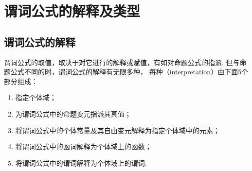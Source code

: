 
\section{谓词公式的解释及类型}
\subsection{谓词公式的解释}
谓词公式的取值，取决于对它进行的解释或赋值，有如对命题公式的指派.
但与命题公式不同的时，谓词公式的解释有无限多种，
每种（interpretation）由下面5个部分组成：\begin{enumerate}
	\item 指定个体域；
	\item 为谓词公式中的命题变元指派其真值；
	\item 将谓词公式中的个体常量及其自由变元解释为指定个体域中的元素；
	\item 将谓词公式中的函词解释为个体域上的函数；
	\item 将谓词公式中的谓词解释为个体域上的谓词.
\end{enumerate}

